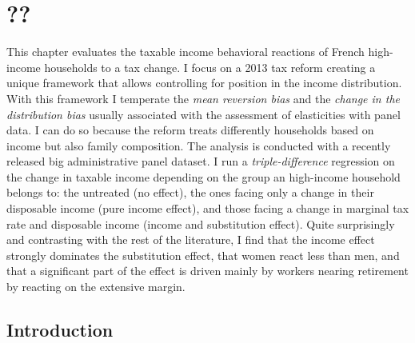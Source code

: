 \ifx\isEmbedded\undefined


\graphicspath{{figures/}}

\setcounter{chapter}{6}
\chapter{\label{??} ??}
\else \fi



\noindent 

  This chapter evaluates the taxable income behavioral reactions of French high-income households to a tax change. I focus on a 2013 tax reform creating a unique framework that allows controlling for position in the income distribution. With this framework I temperate the \emph{mean reversion bias} and the  \emph{change in the distribution bias} usually associated with  the assessment of elasticities with panel data. I can do so because the reform treats differently households based on income but also family composition. The   analysis is conducted with a recently released big administrative panel dataset. I run a \emph{triple-difference} regression on the  change in taxable income depending on the group an high-income household belongs to: the untreated (no effect), the ones facing only a change in their disposable  income (pure income effect), and those facing a change in marginal tax rate and disposable income (income and substitution effect). Quite surprisingly and contrasting with the rest of the literature, I find that the income effect strongly dominates the substitution effect, that women react less than men, and that a significant part of the effect is driven mainly by workers nearing retirement by reacting on the extensive margin.

  


  \newpage

\newpage


  \section{Introduction}












